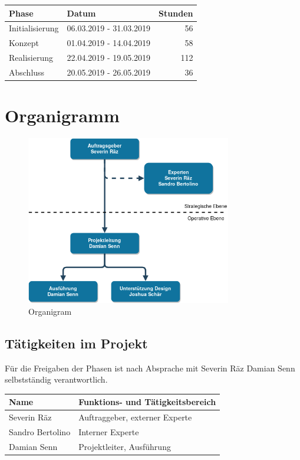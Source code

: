 \begin{longtable}[]{@{}llr@{}}
  \toprule
  Phase           & Datum                   & Stunden\tabularnewline
  \midrule
  \endhead
  Initialisierung & 06.03.2019 - 31.03.2019 & 56\tabularnewline
  Konzept         & 01.04.2019 - 14.04.2019 & 58\tabularnewline
  Realisierung    & 22.04.2019 - 19.05.2019 & 112\tabularnewline
  Abschluss       & 20.05.2019 - 26.05.2019 & 36\tabularnewline
  \bottomrule
\end{longtable}

\clearpage

\section{Organigramm}\label{organigramm}

\begin{figure}[!htb]
  \centering
  \includegraphics[width=0.8\textwidth]{figures/organigram.png}
  \caption{Organigram}
\end{figure}

\subsection{Tätigkeiten im Projekt}\label{tuxe4tigkeiten-im-projekt}

Für die Freigaben der Phasen ist nach Absprache mit Severin Räz Damian Senn
selbstständig verantwortlich.

\begin{longtable}[]{@{}ll@{}}
  \toprule
  Name             & Funktions- und Tätigkeitsbereich\tabularnewline
  \midrule
  \endhead
  Severin Räz      & Auftraggeber, externer Experte\tabularnewline
  Sandro Bertolino & Interner Experte\tabularnewline
  Damian Senn      & Projektleiter, Ausführung\tabularnewline
  \bottomrule
\end{longtable}

